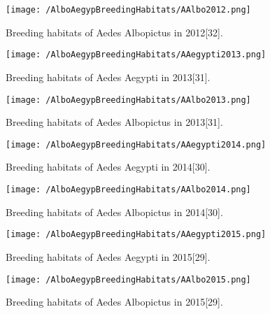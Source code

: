 \documentclass[11pt]{exam}
\begin{document}
\begin{questions}
\begin{enumerate}
\begin{figure}[H]
  \centering
   \texttt{[image: /AlboAegypBreedingHabitats/AAlbo2012.png]} 
  \caption{Breeding habitats of Aedes Albopictus in 2012[32].}
   \label{Breeding habitats of Aedes mosquitoes}
\end{figure} 

\newpage
\begin{figure}[H]
  \centering
   \texttt{[image: /AlboAegypBreedingHabitats/AAegypti2013.png]} 
  \caption{Breeding habitats of Aedes Aegypti in 2013[31].}
   \label{Breeding habitats of Aedes mosquitoes}
\end{figure} 

\begin{figure}[H]
  \centering
   \texttt{[image: /AlboAegypBreedingHabitats/AAlbo2013.png]} 
  \caption{Breeding habitats of Aedes Albopictus in 2013[31].}
   \label{Breeding habitats of Aedes mosquitoes}
\end{figure} 

\newpage
\begin{figure}[H]
  \centering
   \texttt{[image: /AlboAegypBreedingHabitats/AAegypti2014.png]} 
  \caption{Breeding habitats of Aedes Aegypti in 2014[30].}
   \label{Breeding habitats of Aedes mosquitoes}
\end{figure} 

\begin{figure}[H]
  \centering
   \texttt{[image: /AlboAegypBreedingHabitats/AAlbo2014.png]} 
  \caption{Breeding habitats of Aedes Albopictus in 2014[30].}
   \label{Breeding habitats of Aedes mosquitoes}
\end{figure} 

\newpage
\begin{figure}[H]
  \centering
   \texttt{[image: /AlboAegypBreedingHabitats/AAegypti2015.png]} 
  \caption{Breeding habitats of Aedes Aegypti in 2015[29].}
   \label{Breeding habitats of Aedes mosquitoes}
\end{figure} 

\begin{figure}[H]
  \centering
   \texttt{[image: /AlboAegypBreedingHabitats/AAlbo2015.png]} 
  \caption{Breeding habitats of Aedes Albopictus in 2015[29].}
   \label{Breeding habitats of Aedes mosquitoes}
\end{figure} 


\end{enumerate}
\end{questions}
\end{document}
